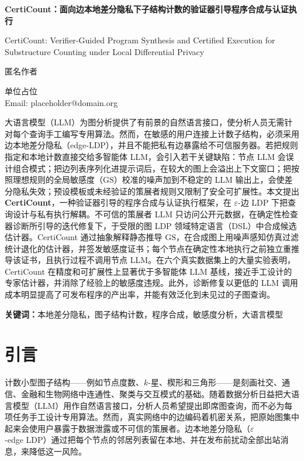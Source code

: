 \documentclass[11pt]{article}
\theoremstyle{ieeeitalic}
\newcommand{\GS}{\mathrm{GS}}
\begin{document}
\begin{center}
{\LARGE\bfseries CertiCount：面向边本地差分隐私下子结构计数的验证器引导程序合成与认证执行\par}
\vspace{0.7em}
{\large CertiCount: Verifier-Guided Program Synthesis and Certified Execution for Substructure Counting under Local Differential Privacy\par}
\vspace{0.9em}
{\large 匿名作者\par}
\vspace{0.25em}
单位占位\\
Email: placeholder@domain.org
\end{center}

\vspace{0.8em}
\par
\vspace{0.3em}
\noindent
大语言模型（LLM）为图分析提供了有前景的自然语言接口，使分析人员无需针对每个查询手工编写专用算法。然而，在敏感的用户连接上计数子结构，必须采用边本地差分隐私（edge-LDP），并且不能把私有边暴露给不可信服务器。若把规则指定和本地计数直接交给多智能体 LLM，会引入若干关键缺陷：节点 LLM 会误计组合模式；把边列表序列化进提示词后，在较大的图上会溢出上下文窗口；把按照理想规则的全局敏感度（$\GS$）校准的噪声加到不稳定的 LLM 输出上，会使差分隐私失效；预设模板或未经验证的策展者规则又限制了安全可扩展性。本文提出 \textbf{CertiCount}，一种验证器引导的程序合成与认证执行框架，在 $\varepsilon$-边 LDP 下把查询设计与私有执行解耦。不可信的策展者 LLM 只访问公开元数据，在确定性检查器诊断所引导的迭代修复下，于受限的图 LDP 领域特定语言（DSL）中合成候选估计器。CertiCount 通过抽象解释静态推导 $\GS$，在合成图上用噪声感知仿真过滤统计退化的估计器，并签发敏感度证书；每个节点在确定性本地执行之前独立重推导该证书，且执行过程不调用节点 LLM。在六个真实数据集上的大量实验表明，CertiCount 在精度和可扩展性上显著优于多智能体 LLM 基线，接近手工设计的专家估计器，并消除了经验上的敏感度违规。此外，诊断修复以更低的 LLM 调用成本明显提高了可发布程序的产出率，并能有效泛化到未见过的子图查询。

\vspace{0.45em}
\noindent\textbf{关键词：}本地差分隐私，图子结构计数，程序合成，敏感度分析，大语言模型

\section{引言}
\label{sec:intro}

计数小型图子结构——例如节点度数、$k$-星、楔形和三角形——是刻画社交、通信、金融和生物网络中连通性、聚类与交互模式的基础\cite{imola2021locally,he2025robust}。随着数据分析日益把大语言模型（LLM）用作自然语言接口\cite{wang2023can,chen2024graphwiz}，分析人员希望提出即席图查询，而不必为每项任务手工设计专用算法。然而，真实网络中的边编码着机密关系，把原始图集中起来会使用户暴露于数据泄露或不可信的策展者\cite{dwork2014algorithmic,imola2021locally}。边本地差分隐私（$\varepsilon$-edge LDP）\cite{imola2021locally,imola2022communication}通过把每个节点的邻居列表留在本地、并在发布前扰动全部出站消息，来降低这一风险。
\end{document}
